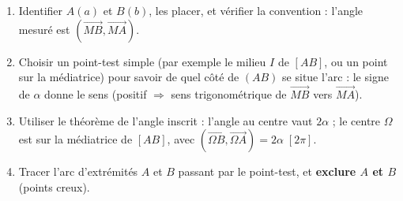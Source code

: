 \documentclass[11pt]{article}
\begin{document}
\begin{methode}[{Construire une ligne de niveau $\arg\left(\frac{z-a}{z-b}\right) = \alpha \;[2\pi]$}]
\begin{enumerate}
\item Identifier $A(a)$ et $B(b)$, les placer, et vérifier la convention : l'angle mesuré est $(\overrightarrow{MB}, \overrightarrow{MA})$.
\item Choisir un point-test simple (par exemple le milieu $I$ de $[AB]$, ou un point sur la médiatrice) pour savoir de quel côté de $(AB)$ se situe l'arc : le signe de $\alpha$ donne le sens (positif $\Rightarrow$ sens trigonométrique de $\overrightarrow{MB}$ vers $\overrightarrow{MA}$).
\item Utiliser le théorème de l'angle inscrit : l'angle au centre vaut $2\alpha$ ; le centre $\Omega$ est sur la médiatrice de $[AB]$, avec $(\overrightarrow{\Omega B}, \overrightarrow{\Omega A}) = 2\alpha\;[2\pi]$.
\item Tracer l'arc d'extrémités $A$ et $B$ passant par le point-test, et \textbf{exclure $A$ et $B$} (points creux).
\end{enumerate}
\end{methode}
\end{document}
